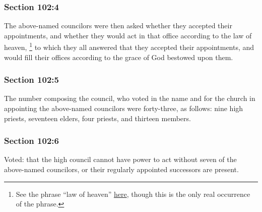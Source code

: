 	\subsubsection{Section 102:4} %
		\label{DC102-4}

		The above-named councilors were then asked whether they accepted their appointments, and whether they would act in that office according to the law of heaven,%
			\footnote{%
				See the phrase ``law of heaven'' \hyperref[LAW-PHRASES]{here}, though this is the only real occurrence of the phrase.
				}
		to which they all answered that they accepted their appointments, and would fill their offices according to the grace of God bestowed upon them.


	\subsubsection{Section 102:5} %
		\label{DC102-5}

		The number composing the council, who voted in the name and for the church in appointing the above-named councilors were forty-three, as follows: nine high priests, seventeen elders, four priests, and thirteen members.


	\subsubsection{Section 102:6} %
		\label{DC102-6}

		Voted: that the high council cannot have power to act without seven of the above-named councilors, or their regularly appointed successors are present.

